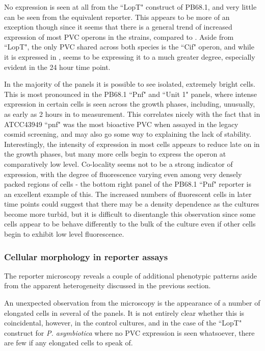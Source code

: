 No expression is seen at all from the ``LopT" construct of PB68.1, and very little can be seen from the equivalent \Plum{} reporter. This appears to be more of an exception though since it seems that there is a general trend of increased expression of most PVC operons in the \Pasy{} strains, compared to \Plum. Aside from ``LopT", the only PVC shared across both species is the ``Cif" operon, and while it is expressed in \Plum, \Pasy{} seems to be expressing it to a much greater degree, especially evident in the 24 hour time point.

In the majority of the panels it is possible to see isolated, extremely bright cells. This is most pronounced in the \Pasy{} PB68.1 ``Pnf" and ``Unit 1" panels, where intense expression in certain cells is seen across the growth phases, including, unusually, as early as 2 hours in to measurement. This correlates nicely with the fact that in \Pasy{} ATCC43949 ``pnf" was the most bioactive PVC when assayed in the legacy cosmid screening, and may also go some way to explaining the lack of stability. Interestingly, the intensity of expression in most cells appears to reduce late on in the growth phases, but many more cells begin to express the operon at comparatively low level. Co-locality seems not to be a strong indicator of expression, with the degree of fluorescence varying even among very densely packed regions of cells - the bottom right panel of the PB68.1 ``Pnf" reporter is an excellent example of this. The increased numbers of fluorescent cells in later time points could suggest that there may be a density dependence as the cultures become more turbid, but it is difficult to disentangle this observation since some cells appear to be behave differently to the bulk of the culture even if other cells begin to exhibit low level fluorescence.

\subsubsection{Cellular morphology in reporter assays}
The reporter microscopy reveals a couple of additional phenotypic patterns aside from the apparent heterogeneity discussed in the previous section.

An unexpected observation from the microscopy is the appearance of a number of elongated cells in several of the panels. It is not entirely clear whether this is coincidental, however, in the control cultures, and in the case of the ``LopT" construct for \emph{P. asymbiotica} where no PVC expression is seen whatsoever, there are few if any elongated cells to speak of.

